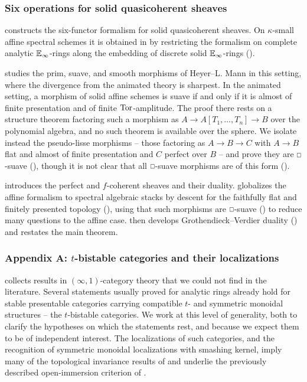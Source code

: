 \subsubsection{Six operations for solid quasicoherent sheaves}\label{subsubsec: intro six operations}
 constructs the six-functor formalism for solid quasicoherent sheaves. On $\kappa$-small affine spectral schemes it is obtained in  by restricting the formalism on complete analytic $\mathbb{E}_{\infty}$-rings along the embedding of discrete solid $\mathbb{E}_{\infty}$-rings (). 

 studies the prim, suave, and smooth morphisms of Heyer--L. Mann in this setting, where the divergence from the animated theory is sharpest. In the animated setting, a morphism of solid affine schemes is suave if and only if it is almost of finite presentation and of finite $\mathrm{Tor}$-amplitude. The proof there rests on a structure theorem factoring such a morphism as $A\to A[T_{1},\dots,T_{n}]\to B$ over the polynomial algebra, and no such theorem is available over the sphere. We isolate instead the pseudo-lisse morphisms -- those factoring as $A\to B\to C$ with $A\to B$ flat and almost of finite presentation and $C$ perfect over $B$ -- and prove they are $\msld$-suave (), though it is not clear that all $\msld$-suave morphisms are of this form (). 

 introduces the perfect and $f$-coherent sheaves and their duality.  globalizes the affine formalism to spectral algebraic stacks by descent for the faithfully flat and finitely presented topology (), using that such morphisms are $\msld$-suave () to reduce many questions to the affine case.  then develops Grothendieck--Verdier duality () and restates the main theorem.
\subsubsection{Appendix A: \texorpdfstring{$t$}{t}-bistable categories and their localizations}\label{subsubsec: intro appendix A}
 collects results in $(\infty,1)$-category theory that we could not find in the literature. Several statements usually proved for analytic rings already hold for stable presentable categories carrying compatible $t$- and symmetric monoidal structures -- the $t$-bistable categories. We work at this level of generality, both to clarify the hypotheses on which the statements rest, and because we expect them to be of independent interest. The localizations of such categories, and the recognition of symmetric monoidal localizations with smashing kernel, imply many of the topological invariance results of  and underlie the previously described open-immersion criterion of .
